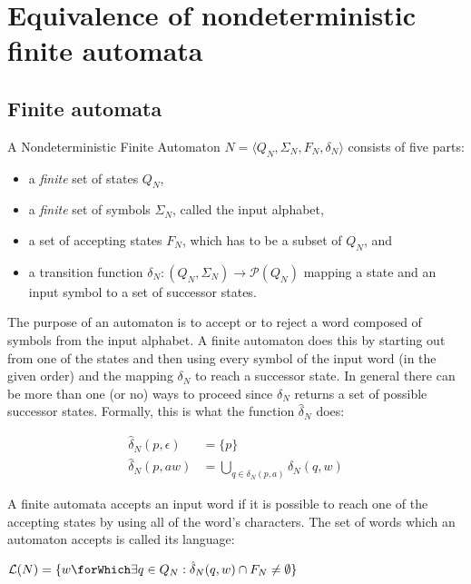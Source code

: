 \section{Equivalence of nondeterministic finite automata}

\subsection{Finite automata}

A Nondeterministic Finite Automaton $N = \langle Q_N, \Sigma_N, F_N, \delta_N \rangle$ consists of five parts:

\begin{itemize}
  \item a \textit{finite} set of states $Q_N$,
  \item a \textit{finite} set of symbols $\Sigma_N$, called the input alphabet,
  \item a set of accepting states $F_N$, which has to be a subset of $Q_N$, and
  \item a transition function $\delta_N : (Q_N, \Sigma_N) \to \mathcal{P}(Q_N)$ mapping a state and an input symbol
          to a set of successor states.
\end{itemize}

The purpose of an automaton is to accept or to reject a word
composed of symbols from the input alphabet.
A finite automaton does this by starting out from one of the
states and then using every symbol of the input word (in the given
order) and the mapping $\delta_N$ to reach a successor state.
In general there can be more than one (or no) ways to proceed since $\delta_N$ returns a set of possible successor states.
Formally, this is what the function $\hat{\delta}_N$ does:

\begin{definition}
  \begin{align*}
    \hat{\delta}_N(p, \epsilon) &= \{p\}\\
    \hat{\delta}_N(p, aw) &= \bigcup_{q \in \delta_N(p, a)}\hat{\delta}_N(q, w)
  \end{align*}
\end{definition}

A finite automata accepts an input word if it is possible to reach one of the
accepting states by using all of the word's characters. The set of words which
an automaton accepts is called its language:

\begin{definition}
  $\mathcal{L}(N) = \{ w \forWhich \exists q \in Q_N: \hat{\delta}_N(q, w) \cap F_N \neq \emptyset \}$
\end{definition}

